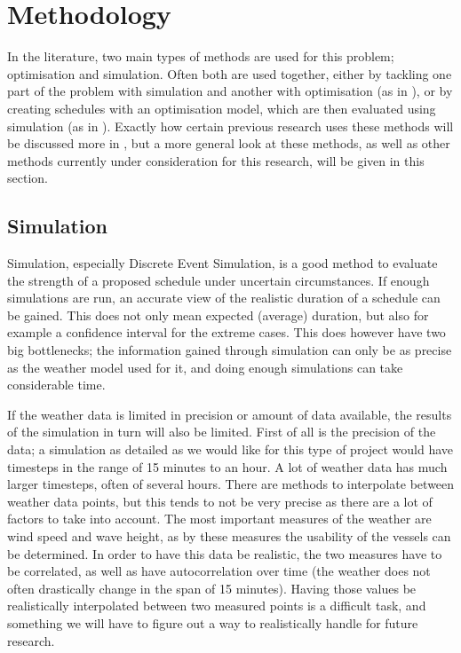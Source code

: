 \documentclass[a4paper,12pt]{article}
\begin{document}
\pagebreak

\section{Methodology} \label{s:meth}
In the literature, two main types of methods are used for this problem; optimisation and simulation. Often both are used together, either by tackling one part of the problem with simulation and another with optimisation (as in \cite{barlow2018mixed}), or by creating schedules with an optimisation model, which are then evaluated using simulation (as in \cite{kerkhove2017optimised}). Exactly how certain previous research uses these methods will be discussed more in , but a more general look at these methods, as well as other methods currently under consideration for this research, will be given in this section. 

\bigskip

\subsection{Simulation} \label{ss:sim}
Simulation, especially Discrete Event Simulation, is a good method to evaluate the strength of a proposed schedule under uncertain circumstances. If enough simulations are run, an accurate view of the realistic duration of a schedule can be gained. This does not only mean expected (average) duration, but also for example a confidence interval for the extreme cases. This does however have two big bottlenecks; the information gained through simulation can only be as precise as the weather model used for it, and doing enough simulations can take considerable time. 

\bigskip

If the weather data is limited in precision or amount of data available, the results of the simulation in turn will also be limited. First of all is the precision of the data; a simulation as detailed as we would like for this type of project would have timesteps in the range of 15 minutes to an hour. A lot of weather data has much larger timesteps, often of several hours. There are methods to interpolate between weather data points, but this tends to not be very precise as there are a lot of factors to take into account. The most important measures of the weather are wind speed and wave height, as by these measures the usability of the vessels can be determined. In order to have this data be realistic, the two measures have to be correlated, as well as have autocorrelation over time (the weather does not often drastically change in the span of 15 minutes). Having those values be realistically interpolated between two measured points is a difficult task, and something we will have to figure out a way to realistically handle for future research.
\end{document}
